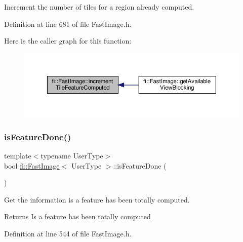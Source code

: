 Increment the number of tiles for a region already computed. 



Definition at line 681 of file Fast\+Image.\+h.

Here is the caller graph for this function\+:
\nopagebreak
\begin{figure}[H]
\begin{center}
\leavevmode
\includegraphics[width=350pt]{dc/d6b/classfi_1_1FastImage_a9778dab9f8a9ec5c834a00a9410f474a_icgraph}
\end{center}
\end{figure}
\mbox{\label{classfi_1_1FastImage_aace944dbe0639a772d2f37ff3804580a}} 
\subsubsection{\texorpdfstring{is\+Feature\+Done()}{isFeatureDone()}}
{\footnotesize\ttfamily template$<$typename User\+Type$>$ \\
bool \hyperlink{classfi_1_1FastImage}{fi\+::\+Fast\+Image}$<$ User\+Type $>$\+::is\+Feature\+Done (\begin{DoxyParamCaption}{ }\end{DoxyParamCaption})\hspace{0.3cm}{\ttfamily [inline]}}



Get the information is a feature has been totally computed. 

\begin{DoxyReturn}{Returns}
Is a feature has been totally computed 
\end{DoxyReturn}


Definition at line 544 of file Fast\+Image.\+h.

